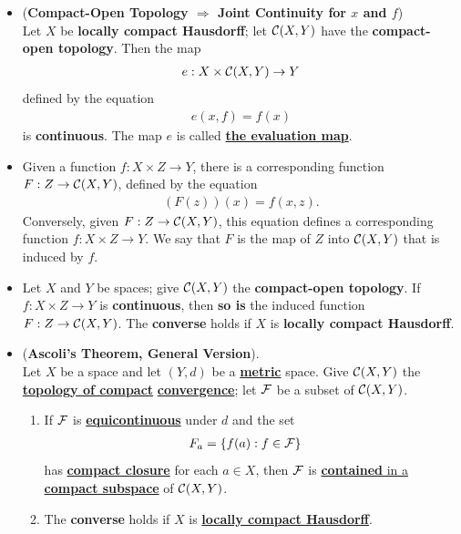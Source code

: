 \documentclass[11pt]{article}
\begin{document}
\begin{itemize}
\item \begin{theorem} (\textbf{Compact-Open Topology $\Rightarrow$ Joint Continuity for $x$ and $f$})\\
Let $X$ be \textbf{locally compact Hausdorff}; let ${\mathcal C}(X, Y)$ have the \textbf{compact-open topology}. Then the map
\begin{align*}
e: X \times {\mathcal C}(X, Y) \rightarrow Y
\end{align*}
defined by the equation
\begin{align*}
e(x, f) = f(x)
\end{align*}
is \textbf{continuous}. The map $e$ is called \underline{\textbf{the evaluation map}}.
\end{theorem}

\item \begin{definition}
Given a function $f : X \times Z \rightarrow Y$, there is a corresponding function $F : Z \rightarrow {\mathcal C}(X, Y)$, defined by the equation
\begin{align*}
(F(z))(x) = f(x, z).
\end{align*}
Conversely, given $F : Z \rightarrow {\mathcal C}(X, Y)$, this equation defines a corresponding function
$f : X \times Z \rightarrow Y$. We say that $F$ is the map of $Z$ into ${\mathcal C}(X, Y)$ that is induced by $f$.
\end{definition}

\item \begin{proposition}
Let $X$ and $Y$ be spaces; give ${\mathcal C}(X, Y)$ the \textbf{compact-open topology}. If $f: X \times Z \rightarrow Y$ is \textbf{continuous}, then \textbf{so is} the induced function $F : Z \rightarrow {\mathcal C}(X, Y)$. The \textbf{converse} holds if $X$ is \textbf{locally compact Hausdorff}.
\end{proposition}

\item \begin{theorem} (\textbf{Ascoli's Theorem, General Version}). \citep{munkres2000topology} \\
Let $X$ be a space and let $(Y, d)$ be a \underline{\textbf{metric}} space. Give ${\mathcal C}(X, Y)$ the \underline{\textbf{topology of compact}} \underline{\textbf{convergence}}; let ${\mathcal F}$ be a subset of ${\mathcal C}(X, Y)$.
\begin{enumerate}
\item If ${\mathcal F}$ is \underline{\textbf{equicontinuous}} under $d$ and the set
\begin{align*}
F_{a} &= \left\{f(a): f \in {\mathcal F}\right\}
\end{align*}
has \underline{\textbf{compact closure}} for each $a \in X$, then ${\mathcal F}$ is \underline{\textbf{contained} in a \textbf{compact subspace}} of ${\mathcal C}(X, Y)$.
\item  The \textbf{converse} holds if $X$ is \underline{\textbf{locally compact Hausdorff}}.
\end{enumerate}
\end{theorem}


\end{itemize}
\end{document}
